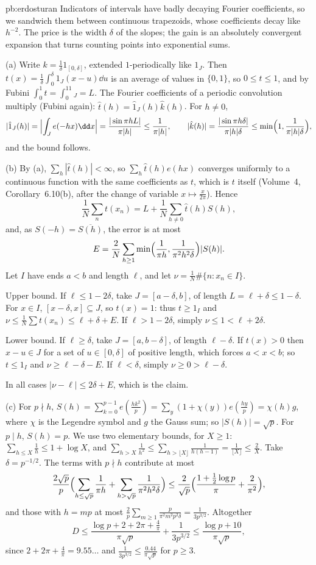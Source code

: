\begin{solution}{pb:erdosturan}
\idea Indicators of intervals have badly decaying Fourier coefficients, so we sandwich them between continuous trapezoids, whose
coefficients decay like $h^{-2}$. The price is the width $\delta$ of the slopes; the gain is an absolutely convergent expansion that
turns counting points into exponential sums.

\writeup (a) Write $k=\frac1\delta1_{[0,\delta]}$, extended $1$-periodically like $1_J$. Then $t(x)=\frac1\delta\int_0^\delta1_J(x-u)\dd u$ is an average of values in
$\{0,1\}$, so $0\le t\le1$, and by Fubini $\int_0^1t=\int_0^11_J=L$. The Fourier coefficients of a periodic convolution multiply (Fubini
again): $\hat t(h)=\hat1_J(h)\hat k(h)$. For $h\ne0$,
\[
|\hat1_J(h)|=\Bigl|\int_Je(-hx)\dd x\Bigr|=\frac{|\sin\pi hL|}{\pi|h|}\le\frac1{\pi|h|},\qquad|\hat k(h)|=\frac{|\sin\pi h\delta|}{\pi|h|\delta}\le\min\Bigl(1,\frac1{\pi|h|\delta}\Bigr),
\]
and the bound follows.

(b) By (a), $\sum_h|\hat t(h)|<\infty$, so $\sum_h\hat t(h)e(hx)$ converges uniformly to a continuous function with the same coefficients as $t$, which is
$t$ itself (Volume~4, Corollary~6.10(b), after the change of variable $x\mapsto\frac x{2\pi}$). Hence
\[
\frac1N\sum_nt(x_n)=L+\frac1N\sum_{h\ne0}\hat t(h)S(h),
\]
and, as $S(-h)=\overline{S(h)}$, the error is at most
\[
E=\frac2N\sum_{h\ge1}\min\Bigl(\frac1{\pi h},\frac1{\pi^2h^2\delta}\Bigr)|S(h)|.
\]
Let $I$ have ends $a<b$ and length $\ell$,
and let $\nu=\frac1N\#\{n:x_n\in I\}$.

Upper bound. If $\ell\le1-2\delta$, take $J=[a-\delta,b]$, of length $L=\ell+\delta\le1-\delta$. For $x\in I$, $[x-\delta,x]\subseteq J$, so $t(x)=1$: thus $t\ge1_I$
and $\nu\le\frac1N\sum t(x_n)\le\ell+\delta+E$. If $\ell>1-2\delta$, simply $\nu\le1<\ell+2\delta$.

Lower bound. If $\ell\ge\delta$, take $J=[a,b-\delta]$, of length $\ell-\delta$. If $t(x)>0$ then $x-u\in J$ for a set of $u\in[0,\delta]$ of positive
length, which forces $a<x<b$; so $t\le1_I$ and $\nu\ge\ell-\delta-E$. If $\ell<\delta$, simply $\nu\ge0>\ell-\delta$.

In all cases $|\nu-\ell|\le2\delta+E$, which is the claim.

(c) For $p\nmid h$, $S(h)=\sum_{k=0}^{p-1}e(\frac{hk^2}p)=\sum_y(1+\chi(y))e(\frac{hy}p)=\chi(h)g$, where $\chi$ is the Legendre symbol and $g$ the Gauss sum; so
$|S(h)|=\sqrt p$. For $p\mid h$, $S(h)=p$. We use two elementary bounds, for $X\ge1$: $\sum_{h\le X}\frac1h\le1+\log X$, and
$\sum_{h>X}\frac1{h^2}\le\sum_{h>\lfloor X\rfloor}\frac1{h(h-1)}=\frac1{\lfloor X\rfloor}\le\frac2X$. Take $\delta=p^{-1/2}$. The terms with $p\nmid h$ contribute at most
\[
\frac{2\sqrt p}p\Bigl(\sum_{h\le\sqrt p}\frac1{\pi h}+\sum_{h>\sqrt p}\frac1{\pi^2h^2\delta}\Bigr)\le\frac2{\sqrt p}\Bigl(\frac{1+\frac12\log p}\pi+\frac2{\pi^2}\Bigr),
\]
and those with $h=mp$ at most $\frac2p\sum_{m\ge1}\frac p{\pi^2m^2p^2\delta}=\frac1{3p^{3/2}}$. Altogether
\[
D\le\frac{\log p+2+2\pi+\frac4\pi}{\pi\sqrt p}+\frac1{3p^{3/2}}\le\frac{\log p+10}{\pi\sqrt p},
\]
since $2+2\pi+\frac4\pi=9.55\ldots$ and $\frac1{3p^{3/2}}\le\frac{0.44}{\pi\sqrt p}$ for $p\ge3$.


\end{solution}
